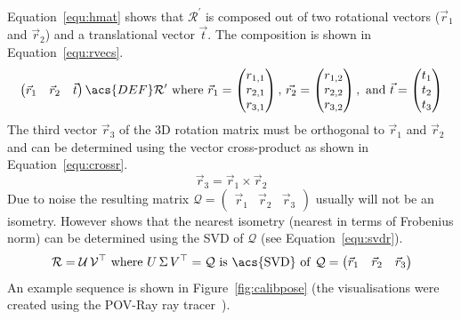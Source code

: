 \documentclass[12pt,a4paper,oneside,openright]{book}
\newcommand{\equ}[1]{Equation~\ref{equ:#1}}
\newcommand{\fig}[1]{Figure~\ref{fig:#1}}
\begin{document}
\begin{CJK}{UTF8}{}
\equ{hmat} shows that $\mathcal{R}^\prime$ is composed out of two rotational vectors ($\vec{r}_1$ and $\vec{r}_2$) and a translational vector $\vec{t}$. The composition is shown in \equ{rvecs}.
\begin{equation}\label{equ:rvecs}
  \begin{pmatrix}\vec{r}_1&\vec{r}_2&\vec{t}\end{pmatrix}\acs{DEF}\mathcal{R}^\prime\mathrm{\ where\ }\vec{r}_1=\begin{pmatrix}r_{1,1}\\r_{2,1}\\r_{3,1}\end{pmatrix}\mathrm{,\ }\vec{r_2}=\begin{pmatrix}r_{1,2}\\r_{2,2}\\r_{3,2}\end{pmatrix}\mathrm{,\ and\ }\vec{t}=\begin{pmatrix}t_1\\t_2\\t_3\end{pmatrix}
\end{equation}
The third vector $\vec{r}_3$ of the \ac{3D} rotation matrix must be orthogonal to $\vec{r}_1$ and $\vec{r}_2$ and can be determined using the vector cross-product as shown in \equ{crossr}.
\begin{equation}\label{equ:crossr}
  \vec{r}_3=\vec{r}_1\times\vec{r}_2
\end{equation}
Due to noise the resulting matrix $\mathcal{Q}=\begin{pmatrix}\vec{r}_1&\vec{r}_2&\vec{r}_3\end{pmatrix}$ usually will not be an isometry. However \citet{zhang2000flexible} shows that the nearest isometry (nearest in terms of Frobenius norm) can be determined using the \ac{SVD} of $\mathcal{Q}$ (see \equ{svdr}).
\begin{equation}\label{equ:svdr}
  \mathcal{R}=\mathcal{U}\,\mathcal{V}^\top\mathrm{\ where\ }U\,\Sigma\,V^\top=\mathcal{Q}\mathrm{\ is\ \acs{SVD}\ of\ }\mathcal{Q}=\begin{pmatrix}\vec{r}_1&\vec{r}_2&\vec{r}_3\end{pmatrix}
\end{equation}
An example sequence is shown in \fig{calibpose} (the visualisations were created using the POV-Ray ray tracer~\citep{RefWorks:51}).
\begin{figure}[htbp]
  \begin{center}
    \begin{minipage}[t]{.32\textwidth}

\end{minipage}
\end{center}
\end{figure}
\end{CJK}
\end{document}
